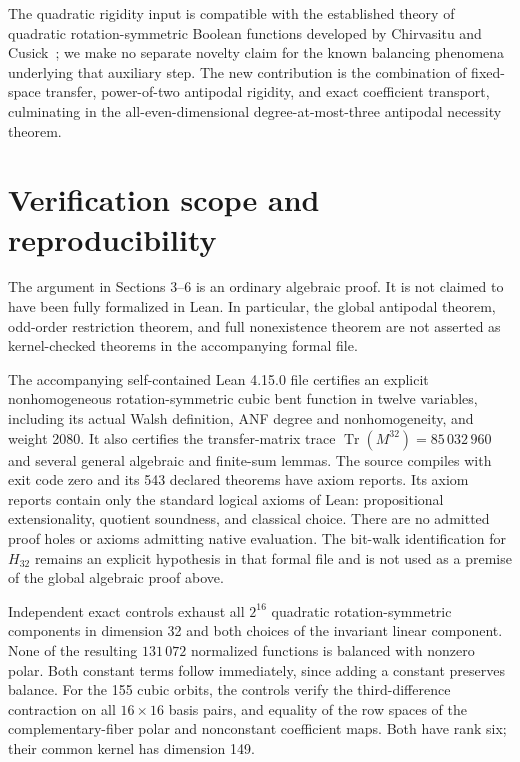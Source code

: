 \documentclass[11pt,a4paper]{article}
\theoremstyle{remark}
\theoremstyle{plain}
\begin{document}
The quadratic rigidity input is compatible with the established theory of quadratic rotation-symmetric Boolean functions developed by Chirvasitu and Cusick~\cite{chircusick}; we make no separate novelty claim for the known balancing phenomena underlying that auxiliary step. The new contribution is the combination of fixed-space transfer, power-of-two antipodal rigidity, and exact coefficient transport, culminating in the all-even-dimensional degree-at-most-three antipodal necessity theorem.


\section{Verification scope and reproducibility}
The argument in Sections 3--6 is an ordinary algebraic proof. It is not claimed to have been fully formalized in Lean. In particular, the global antipodal theorem, odd-order restriction theorem, and full nonexistence theorem are not asserted as kernel-checked theorems in the accompanying formal file.

The accompanying self-contained Lean 4.15.0 file certifies an explicit nonhomogeneous rotation-symmetric cubic bent function in twelve variables, including its actual Walsh definition, ANF degree and nonhomogeneity, and weight 2080. It also certifies the transfer-matrix trace $\operatorname{Tr}(M^{32})=85\,032\,960$ and several general algebraic and finite-sum lemmas. The source compiles with exit code zero and its 543 declared theorems have axiom reports. Its axiom reports contain only the standard logical axioms of Lean: propositional extensionality, quotient soundness, and classical choice. There are no admitted proof holes or axioms admitting native evaluation. The bit-walk identification for $H_{32}$ remains an explicit hypothesis in that formal file and is not used as a premise of the global algebraic proof above.

Independent exact controls exhaust all $2^{16}$ quadratic rotation-symmetric components in dimension 32 and both choices of the invariant linear component. None of the resulting $131\,072$ normalized functions is balanced with nonzero polar. Both constant terms follow immediately, since adding a constant preserves balance. For the 155 cubic orbits, the controls verify the third-difference contraction on all $16\times16$ basis pairs, and equality of the row spaces of the complementary-fiber polar and nonconstant coefficient maps. Both have rank six; their common kernel has dimension 149.
\end{document}
